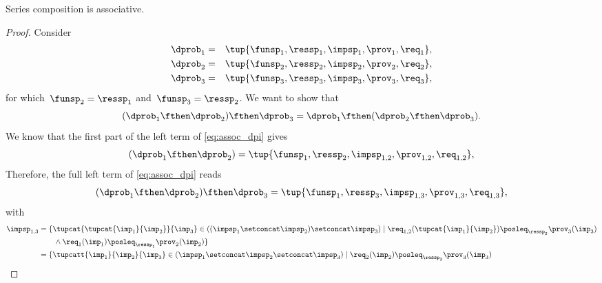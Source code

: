 \begin{marginfigure}
\label{fig:composition-2}
\begin{center}
\end{center}
\end{marginfigure}


\begin{lemma}
  Series composition is associative.
\end{lemma}
\begin{proof}
  Consider
  \begin{equation}
    \begin{aligned}
    \dprob_{1}&=&\tup{\funsp_{1},\ressp_{1},\impsp_{1},\prov_{1},\req_{1}},\\
    \dprob_{2}&=&\tup{\funsp_{2},\ressp_{2},\impsp_{2},\prov_{2},\req_{2}},\\
    \dprob_{3}&=&\tup{\funsp_{3},\ressp_{3},\impsp_{3},\prov_{3},\req_{3}},
  \end{aligned}
  \end{equation}
  for which~$\funsp_{2}=\ressp_{1}$ and~$\funsp_{3}=\ressp_{2}$. We want to show that
  \begin{equation}
    \label{eq:assoc_dpi}
    (\dprob_1\fthen \dprob_2)\fthen \dprob_3=\dprob_1\fthen (\dprob_2\fthen \dprob_3).
  \end{equation}
  We know that the first part of the left term of \cref{eq:assoc_dpi} gives
  \begin{equation}
    (\dprob_{1} \fthen \dprob_{2})
    =
    \tup{ \funsp_{1},\ressp_{2},\impsp_{1,2},\prov_{1,2},\req_{1,2}},
  \end{equation}
  Therefore, the full left term of \cref{eq:assoc_dpi} reads
  \begin{equation}
    \label{eq:dpi_ass_1}
    (\dprob_{1} \fthen \dprob_{2})\fthen \dprob_{3}=\tup{ \funsp_{1},\ressp_{3},\impsp_{1,3},\prov_{1,3},\req_{1,3}},
  \end{equation}
  with
  \begin{equation}
    \begin{aligned}
    \impsp_{1,3}  &=  \{  \tupcat {\tupcat {\imp_{1}} {\imp_{2}}} {\imp_{3}} \in ((\impsp_{1} \setconcat \impsp_{2})\setconcat \impsp_{3})\mid\req_{1,2}(\tupcat {\imp_{1}} {\imp_{2}})\posleq_{\ressp_{2}}\prov_{3}(\imp_{3})
    \\
    &\qquad \wedge \req_{1}(\imp_{1})\posleq_{\ressp_1}\prov_2(\imp_2)\}\\
      &=\{  \tupcatt{\imp_{1}}{\imp_{2}}{\imp_{3}} \in (\impsp_{1} \setconcat \impsp_{2}\setconcat \impsp_{3})\mid\req_{2}(\imp_2)\posleq_{\ressp_{2}}\prov_{3}(\imp_{3})\\

\end{aligned}
\end{equation}
\end{proof}
